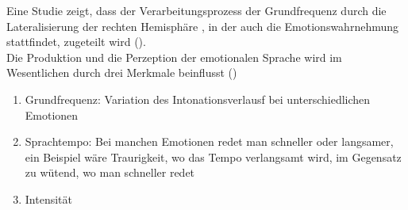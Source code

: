 \documentclass[11pt,a4paper,headsepline,twoside,toc=bibliography]{scrreprt}
\begin{document}
Eine Studie zeigt, dass der Verarbeitungsprozess der Grundfrequenz durch die Lateralisierung der rechten Hemisphäre , in der auch die Emotionswahrnehmung stattfindet, zugeteilt wird (\cite{VanLancker1973a}). \\





Die Produktion und die Perzeption der emotionalen Sprache wird im Wesentlichen durch drei Merkmale beinflusst (\cite{Scherer2001})

\begin{enumerate}
	\item Grundfrequenz: Variation des Intonationsverlausf bei unterschiedlichen Emotionen 
	\item Sprachtempo: Bei manchen Emotionen redet man schneller oder langsamer, ein Beispiel wäre Traurigkeit, wo das Tempo verlangsamt wird, im Gegensatz zu wütend, wo man schneller redet
	\item Intensität
\end{enumerate}
\end{document}
